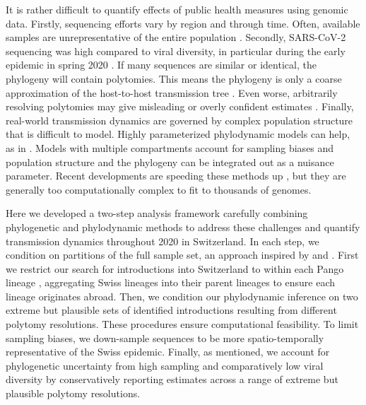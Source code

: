 \documentclass[11pt,twoside,lineno]{pnas-new} %
\begin{document}
It is rather difficult to quantify effects of public health measures using genomic data. Firstly, sequencing efforts vary by region and through time. Often, available samples are unrepresentative of the entire population \cite{Villabona-Arenas2020, DeMaio2015}. Secondly, SARS-CoV-2 sequencing was high compared to viral diversity, in particular during the early epidemic in spring 2020 \cite{Morel2021}. If many sequences are similar or identical, the phylogeny will contain polytomies. This means the phylogeny is only a coarse approximation of the  host-to-host transmission tree \cite{Villabona-Arenas2020}. Even worse, arbitrarily resolving polytomies may give misleading or overly confident estimates \cite{Morel2021}. Finally, real-world transmission dynamics are governed by complex population structure that is difficult to model. Highly parameterized phylodynamic models can help, as in \cite{Miller2020, Geoghegan2020a, Muller2020a}. Models with multiple compartments account for sampling biases and population structure and the phylogeny can be integrated out as a nuisance parameter. Recent developments are speeding these methods up \cite{Lemey2021}, but they are generally too computationally complex to fit to thousands of genomes.

Here we developed a two-step analysis framework carefully combining phylogenetic and phylodynamic methods to address these challenges and quantify transmission dynamics throughout 2020 in Switzerland. In each step, we condition on partitions of the full sample set, an approach inspired by  \cite{Muller2020} and \cite{DuPlessis2021}. First we restrict our search for introductions into Switzerland to within each Pango lineage \cite{Rambaut2000}, aggregating Swiss lineages into their parent lineages to ensure each lineage originates abroad. Then, we condition our phylodynamic inference on two extreme but plausible sets of identified introductions resulting from different polytomy resolutions. These procedures ensure computational feasibility. To limit sampling biases, we down-sample sequences to be more spatio-temporally representative of the Swiss epidemic. Finally, as mentioned, we account for phylogenetic uncertainty from high sampling and comparatively low viral diversity by conservatively reporting estimates across a range of extreme but plausible polytomy resolutions.
\end{document}
